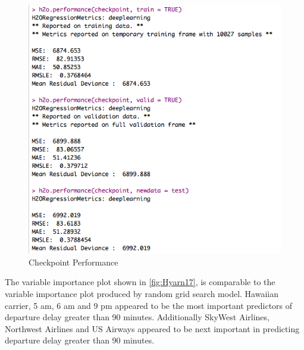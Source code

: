 \documentclass[12pt,twoside]{amherstthesis}
\begin{document}
  \begin{figure}[htbp]
  \centering
  \includegraphics[scale = 0.7,angle = 0]{figure/DeepGridCheckpoint.png}
  \caption[Checkpoint Performance]{\normalsize{Checkpoint Performance}}
  \label{fig:Hyarn143}
  \end{figure}
  
  The variable importance plot shown in \autoref{fig:Hyarn17}, is
  comparable to the variable importance plot produced by random grid
  search model. Hawaiian carrier, 5 am, 6 am and 9 pm appeared to be the
  most important predictors of departure delay greater than 90 minutes.
  Additionally SkyWest Airlines, Northwest Airlines and US Airways
  appeared to be next important in predicting departure delay greater than
  90 minutes.
  
\end{document}
